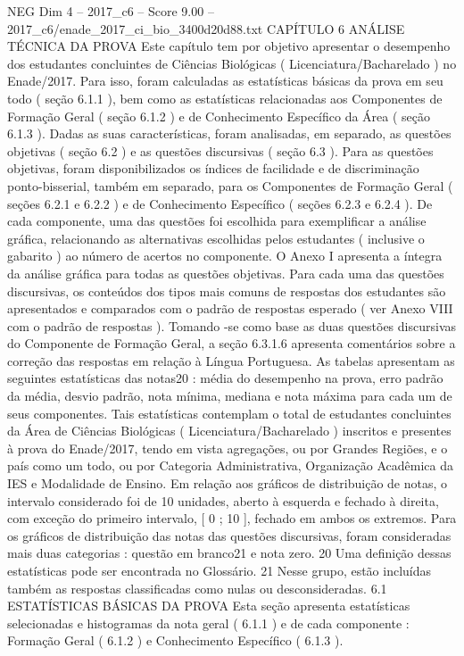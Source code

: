 \begin{textsample}{NEG Dim 4 – 2017\_c6 – Score 9.00 – 2017\_c6/enade\_2017\_ci\_bio\_3400d20d88.txt}  \label{ex:f4_neg_328}
CAPÍTULO 6 ANÁLISE TÉCNICA DA PROVA Este capítulo tem por objetivo apresentar o desempenho dos estudantes concluintes de Ciências Biológicas ( Licenciatura/Bacharelado ) no Enade/2017.
Para isso, foram calculadas as estatísticas básicas da prova em seu todo ( seção 6.1.1 ), bem como as estatísticas relacionadas aos Componentes de Formação Geral ( seção 6.1.2 ) e de Conhecimento Específico da Área ( seção 6.1.3 ).
Dadas as suas características, foram analisadas, em separado, as questões objetivas ( seção 6.2 ) e as questões discursivas ( seção 6.3 ).
Para as questões objetivas, foram disponibilizados os índices de facilidade e de discriminação ponto-bisserial, também em separado, para os Componentes de Formação Geral ( seções 6.2.1 e 6.2.2 ) e de Conhecimento Específico ( seções 6.2.3 e 6.2.4 ).
De cada componente, uma das questões foi escolhida para exemplificar a análise gráfica, relacionando as alternativas escolhidas pelos estudantes ( inclusive o gabarito ) ao número de acertos no componente.
O Anexo I apresenta a íntegra da análise gráfica para todas as questões objetivas.
Para cada uma das questões discursivas, os conteúdos dos tipos mais comuns de respostas dos estudantes são apresentados e comparados com o padrão de respostas esperado ( ver Anexo VIII com o padrão de respostas ).
Tomando -se como base as duas questões discursivas do Componente de Formação Geral, a seção 6.3.1.6 apresenta comentários sobre a correção das respostas em relação à Língua Portuguesa.
As tabelas apresentam as seguintes estatísticas das notas20 : média do desempenho na prova, erro padrão da média, desvio padrão, nota mínima, mediana e nota máxima para cada um de seus componentes.
Tais estatísticas contemplam o total de estudantes concluintes da Área de Ciências Biológicas ( Licenciatura/Bacharelado ) inscritos e presentes à prova do Enade/2017, tendo em vista agregações, ou por Grandes Regiões, e o país como um todo, ou por Categoria Administrativa, Organização Acadêmica da IES e Modalidade de Ensino.
Em relação aos gráficos de distribuição de notas, o intervalo considerado foi de 10 unidades, aberto à esquerda e fechado à direita, com exceção do primeiro intervalo, [ 0 ; 10 ], fechado em ambos os extremos.
Para os gráficos de distribuição das notas das questões discursivas, foram consideradas mais duas categorias : questão em branco21 e nota zero. 20 Uma definição dessas estatísticas pode ser encontrada no Glossário. 21 Nesse grupo, estão incluídas também as respostas classificadas como nulas ou desconsideradas. 6.1 ESTATÍSTICAS BÁSICAS DA PROVA Esta seção apresenta estatísticas selecionadas e histogramas da nota geral ( 6.1.1 ) e de cada componente : Formação Geral ( 6.1.2 ) e Conhecimento Específico ( 6.1.3 ).

\end{textsample}
